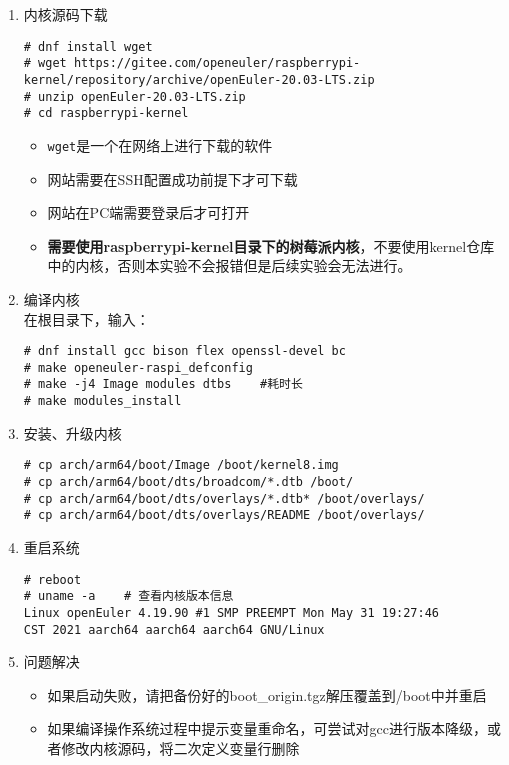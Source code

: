 \documentclass{article}
\begin{document}
\begin{enumerate}
	\item 内核源码下载
	      \begin{lstlisting}
# dnf install wget
# wget https://gitee.com/openeuler/raspberrypi-kernel/repository/archive/openEuler-20.03-LTS.zip
# unzip openEuler-20.03-LTS.zip
# cd raspberrypi-kernel
\end{lstlisting}
	      \begin{itemize}
		      \item \verb|wget|是一个在网络上进行下载的软件
		      \item 网站需要在SSH配置成功前提下才可下载
		      \item 网站在PC端需要登录后才可打开
		      \item \textbf{需要使用raspberrypi-kernel目录下的树莓派内核}，不要使用kernel仓库中的内核，否则本实验不会报错但是后续实验会无法进行。
	      \end{itemize}


	\item 编译内核\\
	      在根目录下，输入：
	      \begin{lstlisting}
# dnf install gcc bison flex openssl-devel bc
# make openeuler-raspi_defconfig
# make -j4 Image modules dtbs    #耗时长
# make modules_install
\end{lstlisting}
	\item 安装、升级内核
	      \begin{lstlisting}
# cp arch/arm64/boot/Image /boot/kernel8.img
# cp arch/arm64/boot/dts/broadcom/*.dtb /boot/          
# cp arch/arm64/boot/dts/overlays/*.dtb* /boot/overlays/
# cp arch/arm64/boot/dts/overlays/README /boot/overlays/
\end{lstlisting}
	\item 重启系统
	      \begin{lstlisting}
# reboot
# uname -a    # 查看内核版本信息
Linux openEuler 4.19.90 #1 SMP PREEMPT Mon May 31 19:27:46 
CST 2021 aarch64 aarch64 aarch64 GNU/Linux
\end{lstlisting}
	\item 问题解决
	      \begin{itemize}
		      \item 如果启动失败，请把备份好的boot\_origin.tgz解压覆盖到/boot中并重启
		      \item 如果编译操作系统过程中提示变量重命名，可尝试对gcc进行版本降级，或者修改内核源码，将二次定义变量行删除
	      \end{itemize}
\end{enumerate}
\end{document}

